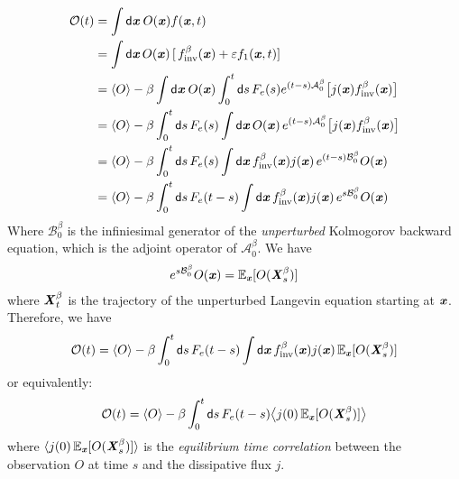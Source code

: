 \documentclass[aip,jcp,a4paper,reprint,onecolumn]{revtex4-1}
\newcommand{\vect}[1]{\textbf{\textit{#1}}}
\newcommand{\dd}{\textsf{d}}
\newcommand{\inv}{\textrm{inv}}
\newcommand{\ml}{\mathcal L}
\newcommand{\fwg}{{\mathcal A}}
\newcommand{\bwg}{{\mathcal B}}
\begin{document}
\begin{align}\nonumber
  \mathcal O(t)
  &=
  \int\dd \vect x \:O(\vect x)f(\vect x, t)  \\\nonumber
  &=
  \int\dd \vect x\, O(\vect x)\,
  [\,f_{\inv}^\beta(\vect x) + \varepsilon f_1(\vect x, t)] \\\nonumber
  &=
  \langle O\rangle
  -
  \beta
  \int \dd \vect x\:
  O(\vect x)
  \int_0^t\dd s\,F_e(s)
  e^{(t-s)\fwg_0^\beta}
  \big[j(\vect x)f^\beta_{\inv}(\vect x)\big]
  \\\nonumber
  &=
  \langle O\rangle
  -
  \beta
  \int_0^t\dd s\,
  F_e(s)
  \int \dd \vect x\,
  O(\vect x)\,
  e^{(t-s)\fwg_0^\beta}
  \big[j(\vect x)f^\beta_{\inv}(\vect x)\big]
  \\\nonumber
  &=
  \langle O\rangle
  -
  \beta
  \int_0^t\dd s\,
  F_e(s)
  \int \dd \vect x\,
  f^\beta_{\inv}(\vect x) j(\vect x)\,
  e^{(t-s)\bwg^\beta_0}
  O(\vect x)\\ \label{eqn:eqi-pert-1}
  &=
  \langle O\rangle
  -
  \beta
  \int_0^t\dd s\,
  F_e(t-s)
  \int \dd \vect x\,
  f^\beta_{\inv}(\vect x) j(\vect x)\,
  e^{s\bwg_0^\beta}
  O(\vect x)
\end{align}
Where $\bwg^\beta_0$ is the infiniesimal generator of the \emph{unperturbed} 
Kolmogorov backward equation, which is the adjoint operator of $\fwg^\beta_0$.
We have
\begin{align}
  e^{s\bwg^\beta_0} O(\vect x) = \mathbb E_{\vect x} [O(\vect X^\beta_s)]
\end{align}
where $\vect X^\beta_t$ is the trajectory of the unperturbed Langevin equation
starting at $\vect x$.
Therefore, we have
\begin{align}
  \mathcal O(t)
  =
  \langle O\rangle
  -
  \beta
  \int_0^t\dd s\,
  F_e(t-s)
  \int \dd \vect x\,
  f^\beta_{\inv}(\vect x)
  j(\vect x)\,
  \mathbb E_{\vect x} [O(\vect X^\beta_s)]
\end{align}
or equivalently:
\begin{align}\label{eqn:lr}
  \mathcal O(t)
  =
  \langle O\rangle
  -
  \beta
  \int_0^t\dd s\,
  F_e(t-s)
  \big\langle
  j(0)\,
  \mathbb E_{\vect x} [O(\vect X^\beta_s)]
  \big\rangle
\end{align}
where $  \langle
  j(0)\,
  \mathbb E_{\vect x} [O(\vect X^\beta_s)]
  \rangle$ is the \emph{equilibrium time
  correlation} between the observation $O$ at time $s$ and the
dissipative flux $j$.
\end{document}
